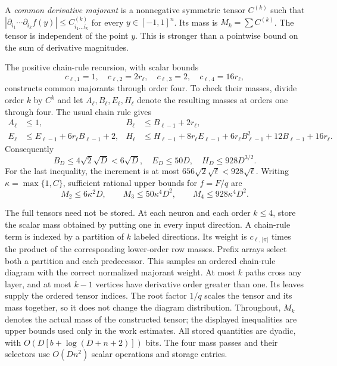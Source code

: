 A \emph{common derivative majorant} is a nonnegative symmetric tensor
$C^{(k)}$ such that
$|\partial_{i_1}\cdots\partial_{i_k}f(y)|\le C^{(k)}_{i_1\ldots i_k}$
for every $y\in[-1,1]^n$.  Its mass is $M_k=\sum C^{(k)}$.
The tensor is independent of the point $y$.  This is stronger than a
pointwise bound on the sum of derivative magnitudes.

The positive chain-rule recursion, with scalar bounds
\begin{equation}
 c_{\ell,1}=1,\quad c_{\ell,2}=2r_\ell,
 \quad c_{\ell,3}=2,\quad c_{\ell,4}=16r_\ell,
 \label{eq:column-scalar-majorants}
\end{equation}
constructs common majorants through order four.  To check their masses,
divide order $k$ by $C^k$ and let $A_\ell,B_\ell,E_\ell,H_\ell$
denote the resulting masses at orders one through four.  The usual
chain rule gives
\begin{align*}
 A_\ell&\le1,&
 B_\ell&\le B_{\ell-1}+2r_\ell,\\
 E_\ell&\le E_{\ell-1}+6r_\ell B_{\ell-1}+2,&
 H_\ell&\le H_{\ell-1}+8r_\ell E_{\ell-1}
       +6r_\ell B_{\ell-1}^2+12B_{\ell-1}+16r_\ell.
\end{align*}
Consequently
\[
 B_D\le4\sqrt2\sqrt D<6\sqrt D,\quad E_D\le50D,
 \quad H_D\le928D^{3/2}.
\]
For the last inequality, the increment is at most
$656\sqrt2\sqrt\ell<928\sqrt\ell$.
Writing $\kappa=\max\{1,C\}$, sufficient rational upper bounds for
$f=F/q$ are
\begin{equation}
 M_2\le6\kappa^2D,
 \qquad M_3\le50\kappa^4D^2,
 \qquad M_4\le928\kappa^4D^2.
 \label{eq:column-derivative-masses}
\end{equation}

The full tensors need not be stored.  At each neuron and each order
$k\le4$, store the scalar mass obtained by putting one in every input
direction.  A chain-rule term is indexed by a partition of $k$ labeled
directions.  Its weight is $c_{\ell,|\pi|}$ times the product of the
corresponding lower-order row masses.  Prefix arrays select both a
partition and each predecessor.  This samples an ordered chain-rule
diagram with the correct normalized majorant weight.  At most $k$
paths cross any layer, and at most $k-1$ vertices have derivative
order greater than one.  Its leaves supply the ordered tensor indices. The root factor $1/q$
scales the tensor and its mass together, so it does not change the
diagram distribution. Throughout, $M_k$ denotes the actual mass of
the constructed tensor; the displayed inequalities are upper bounds
used only in the work estimates.
All stored quantities are dyadic, with $O(D[b+\log(D+n+2)])$ bits.
The four mass passes and their selectors use $O(Dn^2)$ scalar
operations and storage entries.

